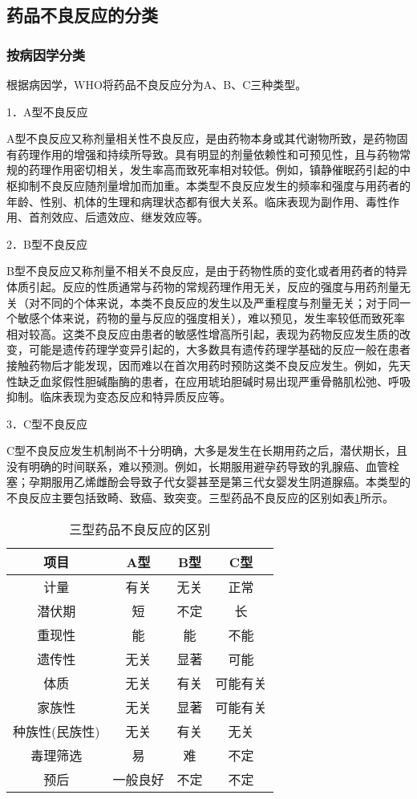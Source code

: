 \subsection{药品不良反应的分类}

\subsubsection{按病因学分类}

根据病因学，WHO将药品不良反应分为A、B、C三种类型。

1．A型不良反应

A型不良反应又称剂量相关性不良反应，是由药物本身或其代谢物所致，是药物固有药理作用的增强和持续所导致。具有明显的剂量依赖性和可预见性，且与药物常规的药理作用密切相关，发生率高而致死率相对较低。例如，镇静催眠药引起的中枢抑制不良反应随剂量增加而加重。本类型不良反应发生的频率和强度与用药者的年龄、性别、机体的生理和病理状态都有很大关系。临床表现为副作用、毒性作用、首剂效应、后遗效应、继发效应等。

2．B型不良反应

B型不良反应又称剂量不相关不良反应，是由于药物性质的变化或者用药者的特异体质引起。反应的性质通常与药物的常规药理作用无关，反应的强度与用药剂量无关（对不同的个体来说，本类不良反应的发生以及严重程度与剂量无关；对于同一个敏感个体来说，药物的量与反应的强度相关），难以预见，发生率较低而致死率相对较高。这类不良反应由患者的敏感性增高所引起，表现为药物反应发生质的改变，可能是遗传药理学变异引起的，大多数具有遗传药理学基础的反应一般在患者接触药物后才能发现，因而难以在首次用药时预防这类不良反应发生。例如，先天性缺乏血浆假性胆碱酯酶的患者，在应用琥珀胆碱时易出现严重骨骼肌松弛、呼吸抑制。临床表现为变态反应和特异质反应等。

3．C型不良反应

C型不良反应发生机制尚不十分明确，大多是发生在长期用药之后，潜伏期长，且没有明确的时间联系，难以预测。例如，长期服用避孕药导致的乳腺癌、血管栓塞；孕期服用乙烯雌酚会导致子代女婴甚至是第三代女婴发生阴道腺癌。本类型的不良反应主要包括致畸、致癌、致突变。三型药品不良反应的区别如表\ref{tab3-1}所示。

\begin{table}[ht]
    \caption{三型药品不良反应的区别}
    \label{tab3-1}
    \centering
    \begin{tabular}{cccc}
    \toprule
    项目 & A型 & B型 & C型 \\
    \midrule
    计量 & 有关 & 无关 & 正常\\
    潜伏期 & 短 & 不定 & 长 \\
    重现性 & 能 & 能 & 不能\\
    遗传性 & 无关 & 显著 & 可能\\
    体质 & 无关 & 有关 & 可能有关\\
    家族性 & 无关 & 显著 & 可能有关\\
    种族性(民族性) & 无关 & 有关 & 无关\\
    毒理筛选 & 易 & 难 & 不定\\
    预后 & 一般良好 & 不定 & 不定\\
    \bottomrule
    \end{tabular}
\end{table}


